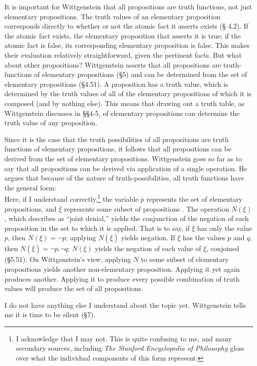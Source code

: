 \documentclass[man,12pt,natbib]{apa6}
\begin{document}
It is important for Wittgenstein that all propositions are truth functions, not
just elementary propositions. The truth values of an elementary proposition
corresponds directly to whether or not the atomic fact it asserts exists (\S
4.2). If the atomic fact exists, the elementary proposition that asserts it is
true; if the atomic fact is false, its corresponding elementary proposition is
false. This makes their evaluation relatively straightforward, given the
pertinent facts. But what about other propositions? Wittgenstein asserts that
all propositions are truth-functions of elementary propositions (\S 5) and can
be determined from the set of elementary propositions (\S 4.51). A proposition
has a truth value, which is determined by the truth values of all of the
elementary propositions of which it is composed (and by nothing else). This
means that drawing out a truth table, as Wittgenstein discusses in \S\S 4-5, of
elementary propositions can determine the truth value of any proposition.

Since it is the case that the truth possibilities of all propositions are truth
functions of elementary propositions, it follows that all propositions can be
derived from the set of elementary propositions. Wittgenstein goes so far as to
say that all propositions can be derived via application of a single operation.
He argues that because of the nature of truth-possibilities, all truth
functions have the general form: 
\begin{equation}
	[ \overline{p}, \overline{\xi}, N(\overline{\xi}) ]
\end{equation}
Here, if I understand correctly,\footnote{I acknowledge that I may not. This is
quite confusing to me, and many secondary sources, including \emph{The Stanford
Encyclopedia of Philosophy} gloss over what the individual components of this
form represent.} the variable $ \overline{p} $ represents the set of elementary
propositions, and $ \overline{\xi} $ represents some subset of propositions
\citep{Speaks07}. The operation $ N( \xi ) $, which \citet{Geach81} describes as
``joint denial,'' yields the conjunction of the negation of each proposition in
the set to which it is applied. That is to say, if $\xi$ has only the value
$p$, then $N(\xi) = \neg p$; applying $N(\overline{\xi})$ yields negation. If
$\xi$ has the values $p$ and $q$, then $N(\overline{\xi}) = \neg p. \neg q$;
$N(\xi)$ yields the negation of each value of $\xi$, conjoined (\S 5.51). On
Wittgenstein's view, applying $N$ to some subset of elementary propositions
yields another non-elementary proposition. Applying it yet again produces
another. Applying it to produce every possible combination of truth values will
produce the set of all propositions.

I do not have anything else I understand about the topic yet. Wittgenstein
tells me it is time to be silent (\S 7).

\clearpage


\end{document}
